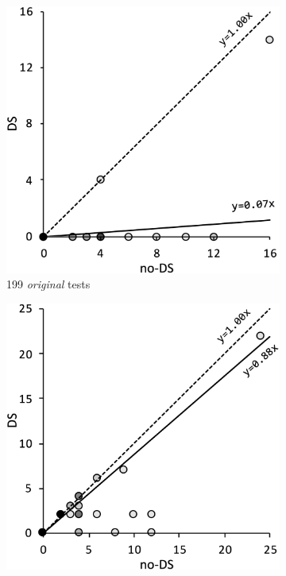 \begin{figure}[t]
  \begin{subfigure}[t]{0.23\textwidth}
    \includegraphics[width=\linewidth]{img/conc-precision}
    \vspace*{-1.5em}
    \caption{199 \textit{original} tests}
    \label{fig:conc-precision}
  \end{subfigure}
  \begin{subfigure}[t]{0.23\textwidth}
    \includegraphics[width=\linewidth]{img/abs-precision}

\end{subfigure}
\end{figure}
